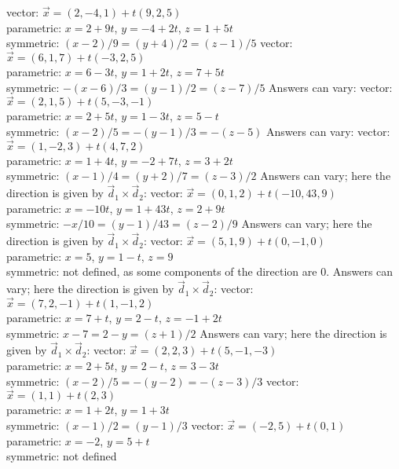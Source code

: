 \begin{Answer}
\Question vector: $\vec x = (2,-4,1) + t(9,2,5)$\\
parametric: $x= 2+9t$, $y=-4+2t$, $z = 1+5t$\\
symmetric: $(x-2)/9 =(y+4)/2 = (z-1)/5$
\Question vector: $\vec x = (6,1,7) + t(-3,2,5)$\\
parametric: $x= 6-3t$, $y=1+2t$, $z = 7+5t$\\
symmetric: $-(x-6)/3 =(y-1)/2 = (z-7)/5$
\Question Answers can vary:
vector: $\vec x = (2,1,5) + t(5,-3,-1)$\\
parametric: $x= 2+5t$, $y=1-3t$, $z = 5-t$\\
symmetric: $(x-2)/5 =-(y-1)/3 = -(z-5)$
\Question Answers can vary:
vector: $\vec x = (1,-2,3) + t(4,7,2)$\\
parametric: $x= 1+4t$, $y=-2+7t$, $z = 3+2t$\\
symmetric: $(x-1)/4 =(y+2)/7 = (z-3)/2$
\Question Answers can vary; here the direction is given by $\vec d_1\times \vec d_2$:
vector: $\vec x = (0,1,2) + t(-10,43,9)$\\
parametric: $x= -10t$, $y=1+43t$, $z = 2+9t$\\
symmetric: $-x/10 =(y-1)/43 = (z-2)/9$
\Question Answers can vary; here the direction is given by $\vec d_1\times \vec d_2$:
vector: $\vec x = (5,1,9) + t(0,-1,0)$\\
parametric: $x= 5$, $y=1-t$, $z = 9$\\
symmetric: not defined, as some components of the direction are 0.
\Question Answers can vary; here the direction is given by $\vec d_1\times \vec d_2$:
vector: $\vec x = (7,2,-1) + t(1,-1,2)$\\
parametric: $x= 7+t$, $y=2-t$, $z = -1+2t$\\
symmetric: $x-7=2-y=(z+1)/2$
\Question Answers can vary; here the direction is given by $\vec d_1\times \vec d_2$:
vector: $\vec x = (2,2,3) + t(5,-1,-3)$\\
parametric: $x= 2+5t$, $y=2-t$, $z = 3-3t$\\
symmetric: $(x-2)/5=-(y-2)=-(z-3)/3$
\Question vector: $\vec x = (1,1) + t(2,3)$\\
parametric: $x= 1+2t$, $y=1+3t$\\
symmetric: $(x-1)/2=(y-1)/3$
\Question vector: $\vec x = (-2,5) + t(0,1)$\\
parametric: $x= -2$, $y=5+t$\\
symmetric: not defined

\end{Answer}
